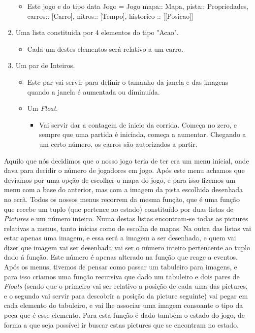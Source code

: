 \documentclass[a4paper]{report} %
\begin{document}
\begin{enumerate}
\begin{itemize}
     \item Este jogo e do tipo data Jogo = Jogo  { mapa:: Mapa, pista:: Propriedades, carros:: [Carro], nitros:: [Tempo], historico :: [[Posicao]]}
   \end{itemize}
   \item Uma lista constituida por 4 elementos do tipo "Acao".
   \begin{itemize}
   \item Cada um destes elementos será relativo a um carro.
   \end{itemize}
   \item Um par de Inteiros.
   \begin{itemize}
   \item Este par vai servir para definir o tamanho da janela e das imagens quando a janela  é aumentada ou diminuída.
   \item Um \textit{Float}.
   \begin{itemize}
   \item Vai servir dar a contagem de inicio da corrida. Começa no zero, e sempre que uma partida é iniciada, começa a aumentar. Chegando a um certo número, os carros são autorizados a partir.
   \end{itemize}
   \end{itemize}
\end{enumerate}
    Aquilo que nós decidimos que o nosso jogo teria de ter era um menu inicial, onde dava para decidir o número de jogadores em jogo. Após este menu achamos que devíamos por uma opção de escolher o mapa do jogo, e para isso fizemos um menu com a base do anterior, mas com a imagem da pista escolhida desenhada no ecrã. Todos os nossos menus recorrem da mesma função, que é uma função que recebe um tuplo (que pertence ao estado) constituído por duas listas de \textit{Pictures} e um número inteiro. Numa destas listas encontram-se todas as pictures relativas a menus, tanto inicias como de escolha de mapas. Na outra das listas vai estar apenas uma imagem, e essa será a imagem a ser desenhada, e quem vai dizer que imagem vai ser desenhada vai ser o número inteiro pertencente ao tuplo dado á função. Este número é apenas alterado na função que reage a eventos.
    Após os menus, tivemos de pensar como passar um tabuleiro para imagens, e para isso criamos uma função recursiva que dado um tabuleiro e dois pares de \textit{Floats} (sendo que o primeiro vai ser relativo a posição de cada uma das pictures, e o segundo vai servir para descobrir a posição da picture seguinte) vai pegar em cada elemento do tabuleiro, e vai lhe associar uma imagem consoante o tipo da peca que é esse elemento. Para esta função é dado também o estado do jogo, de forma a que seja possível ir buscar estas pictures que se encontram no estado.
\end{document}
